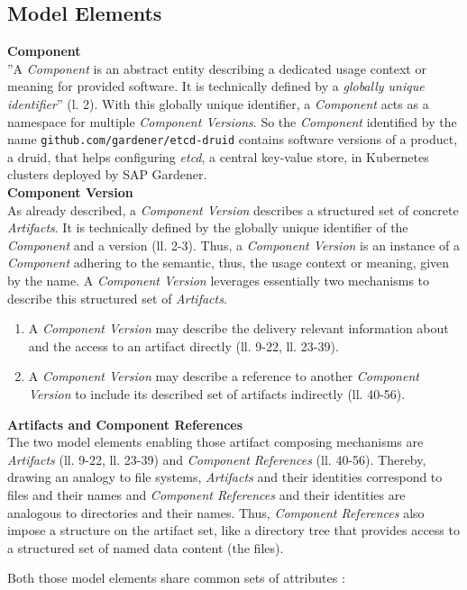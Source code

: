 \subsection{Model Elements}

\noindent\textbf{Component}\\
''A \emph{Component} is an abstract entity describing a dedicated usage context or meaning for provided software. It is technically defined by a \emph{globally unique identifier}''\cite{OCMSpec} (l. 2). With this globally unique identifier, a \emph{Component} acts as a namespace for multiple \emph{Component Versions}. So the \emph{Component} identified by the name \lstinline|github.com/gardener/etcd-druid| contains software versions of a product, a druid, that helps configuring \emph{etcd}, a central key-value store, in Kubernetes clusters deployed by SAP Gardener.\\

\noindent\textbf{Component Version}\\
As already described, a \emph{Component Version} describes a structured set of concrete \emph{Artifacts}. It is technically defined by the globally unique identifier of the \emph{Component} and a version (ll. 2-3). Thus, a \emph{Component Version} is an instance of a \emph{Component} adhering to the semantic, thus, the usage context or meaning, given by the name. A \emph{Component Version} leverages essentially two mechanisms to describe this structured set of \emph{Artifacts}. 
\begin{enumerate}
\item A \emph{Component Version} may describe the delivery relevant information about and the access to an artifact directly (ll. 9-22, ll. 23-39).
\item A \emph{Component Version} may describe a reference to another \emph{Component Version} to include its described set of artifacts indirectly (ll. 40-56).
\end{enumerate}

\noindent\textbf{Artifacts and Component References}\\
The two model elements enabling those artifact composing mechanisms are \emph{Artifacts} (ll. 9-22, ll. 23-39) and \emph{Component References} (ll. 40-56). Thereby, drawing an analogy to file systems, \emph{Artifacts} and their identities correspond to files and their names and \emph{Component References} and their identities are analogous to directories and their names. Thus, \emph{Component References} also impose a structure on the artifact set, like a directory tree that provides access to a structured set of named data content (the files).\par
\noindent Both those model elements share common sets of attributes \cite{OCMSpec}:\\

